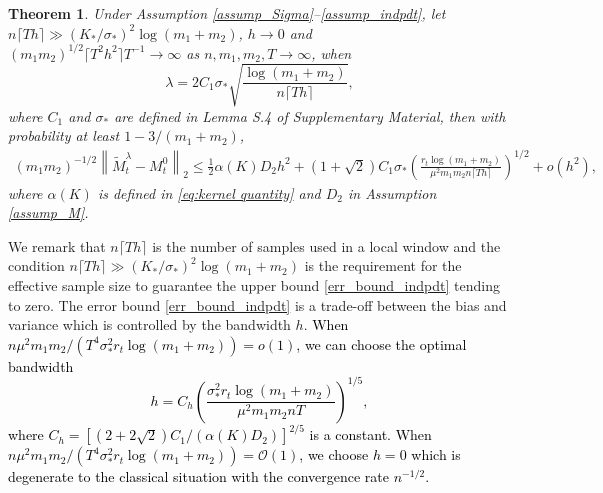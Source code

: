 \documentclass[12pt]{article}
\newcommand{\oldchange}[1]{\textcolor{black}{#1}}
\newtheorem{thm}{Theorem}
\begin{document}
 

  \begin{thm}\label{thm_total}
  Under Assumption \ref{assump_Sigma}--\ref{assump_indpdt}, let $n \lceil T h\rceil  \gg(K_*/\sigma_*)^2 \log(m_1+m_2)$, $h\rightarrow0$ and \\$(m_1m_2)^{1/2}\lceil T^2h^2\rceil T^{-1} \rightarrow\infty$ as $n,m_1,m_2,T\rightarrow\infty$, when
  $$\lambda = 2C_1\sigma_*\sqrt{\frac{\log(m_1+m_2)}{n \lceil Th\rceil}}, $$
  where $C_1$ and $\sigma_*$ are defined in Lemma S.4 of Supplementary Material, then 
  with probability at least $1-3/(m_1+m_2)$,
  \begin{equation} \label{err_bound_indpdt}   
  \begin{aligned}
  (m_1m_2)^{-1/2}\left\|\widetilde{M}_t^\lambda - M_t^0\right\|_2 \le \frac{1}{2}\alpha(K)D_2h^2 +\left(1+\sqrt{2}\right)C_1\sigma_*\left(\frac{r_t\log(m_1+m_2)}{\mu^2m_1m_2 n \lceil Th \rceil}\right)^{1/2}+o(h^2),
  \end{aligned}
  \end{equation}
  where $\alpha(K)$ is defined in \eqref{eq:kernel quantity} and $D_2$ in Assumption \ref{assump_M}.
  \end{thm}

  We remark that $n \lceil T h \rceil$ is the number of samples used in a local window and the condition $n \lceil T h\rceil  \gg (K_*/\sigma_*)^2 \log(m_1+m_2)$ is the requirement for the effective sample size to guarantee the upper bound \eqref{err_bound_indpdt} tending to zero.  
  The error bound \eqref{err_bound_indpdt} is a trade-off between the bias and variance which is controlled by the bandwidth $h$.
  \oldchange{When $n\mu^2 m_1m_2/(T^4\sigma_{*}^2r_t\log(m_1+m_2)) = o(1)$, we can choose the optimal bandwidth
  \begin{equation}
  \label{opt_h}
  h=C_h\left(\frac{\sigma_*^2r_t\log(m_1+m_2)}{\mu^2m_1m_2 n T}\right)^{1/5},
  \end{equation}
  where $C_h=\left[(2+2\sqrt{2})C_1/(\alpha(K)D_2)\right]^{2/5}$ is a constant. When $n\mu^2 m_1m_2/(T^4\sigma_{*}^2r_t\log(m_1+m_2)) = \mathcal{O}(1)$, we choose $h = 0$ which is degenerate to the classical situation with the convergence rate $n^{-1/2}$.}
\end{document}
